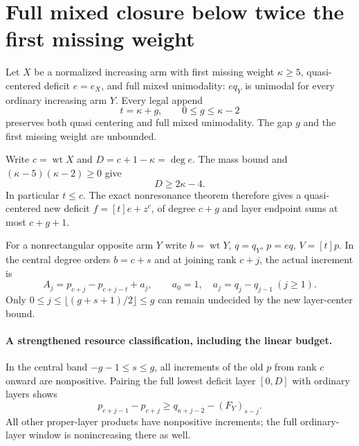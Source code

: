 \section{Full mixed closure below twice the first missing weight}
\begin{theorem}
Let $X$ be a normalized increasing arm with first missing
weight $\kappa\ge5$, quasi-centered deficit $e=e_X$, and
full mixed unimodality: $e q_Y$ is unimodal for every ordinary
increasing arm $Y$. Every legal append
\[
                   t=\kappa+g,\qquad0\le g\le\kappa-2
\]
preserves both quasi centering and full mixed unimodality.
The gap $g$ and the first missing weight are unbounded.
\end{theorem}

Write $c=\operatorname{wt}X$ and $D=c+1-\kappa=\deg e$.
The mass bound and $(\kappa-5)(\kappa-2)\ge0$ give
\[
                    D\ge2\kappa-4.                     \tag{1}
\]
In particular $t\le c$. The exact nonresonance theorem
therefore gives a quasi-centered new deficit
$f=[t]e+z^c$, of degree $c+g$ and layer endpoint sums
at most $c+g+1$.

For a nonrectangular opposite arm $Y$ write $b=\operatorname{wt}Y$,
$q=q_Y$, $p=e q$, $V=[t]p$. In the central degree orders
$b=c+s$ and at joining rank $c+j$, the actual increment is
\[
        A_j=p_{c+j}-p_{c+j-t}+a_j,\qquad
        a_0=1,\quad a_j=q_j-q_{j-1}\ (j\ge1).            \tag{2}
\]
Only $0\le j\le\lfloor(g+s+1)/2\rfloor\le g$ can
remain undecided by the new layer-center bound.

\paragraph{A strengthened resource classification, including the linear budget.}
In the central band $-g-1\le s\le g$, all increments of
the old $p$ from rank $c$ onward are nonpositive. Pairing
the full lowest deficit layer $[0,D]$ with ordinary layers
shows
\[
 p_{c+j-1}-p_{c+j}\ge q_{\kappa+j-2}-(F_Y)_{s-j}.
                                                               \tag{3}
\]
All other proper-layer products have nonpositive increments;
the full ordinary-layer window is nonincreasing there as well.

